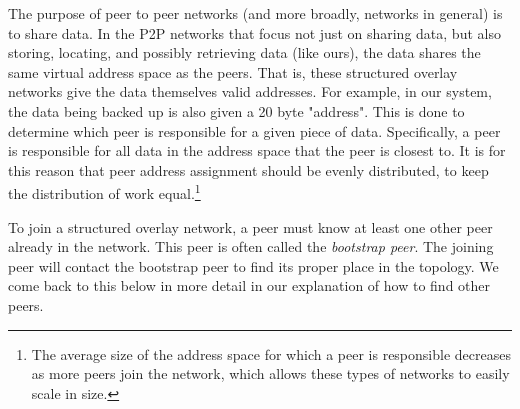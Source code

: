 \documentclass[12pt]{report}
\begin{document}
The purpose of peer to peer networks (and more broadly, networks in general) is to share data. In the P2P networks that focus not just on sharing data, but also storing, locating, and possibly retrieving data (like ours), the data shares the same virtual address space as the peers. That is, these structured overlay networks give the data themselves valid addresses. For example, in our system, the data being backed up is also given a 20 byte "address". This is done to determine which peer is responsible for a given piece of data. Specifically, a peer is responsible for all data in the address space that the peer is closest to. It is for this reason that peer address assignment should be evenly distributed, to keep the distribution of work equal.\footnote{The average size of the address space for which a peer is responsible decreases as more peers join the network, which allows these types of networks to easily scale in size.}

To join a structured overlay network, a peer must know at least one other peer already in the network. This peer is often called the \textit{bootstrap peer}. The joining peer will contact the bootstrap peer to find its proper place in the topology. We come back to this below in more detail in our explanation of how to find other peers.

\end{document}
